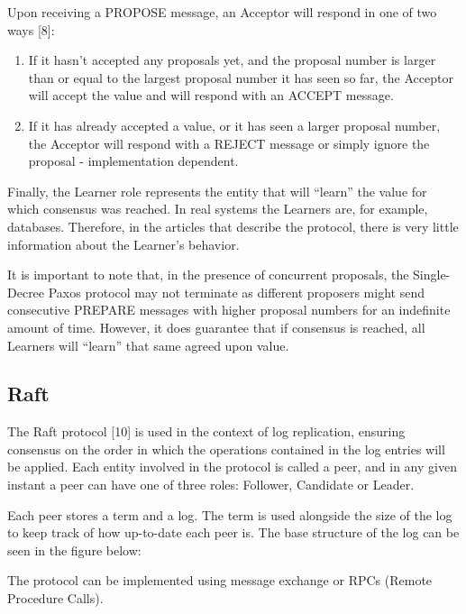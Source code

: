 Upon receiving a PROPOSE message, an Acceptor will respond in one of two ways [8]:

\begin{enumerate}
  \item If it hasn’t accepted any proposals yet, and the proposal number is larger than or equal to the largest proposal number it has seen so far, the Acceptor will accept the value and will respond with an ACCEPT message.
  \item If it has already accepted a value, or it has seen a larger proposal number, the Acceptor will respond with a REJECT message or simply ignore the proposal - implementation dependent.
\end{enumerate}

Finally, the Learner role represents the entity that will “learn” the value for which consensus was reached. In real systems the Learners are, for example, databases. Therefore, in the articles that describe the protocol, there is very little information about the Learner’s behavior.


It is important to note that, in the presence of concurrent proposals, the Single-Decree Paxos protocol may not terminate as different proposers might send consecutive PREPARE messages with higher proposal numbers for an indefinite amount of time. However, it does guarantee that if consensus is reached, all Learners will “learn” that same agreed upon value.




\subsection{Raft}

The Raft protocol [10] is used in the context of log replication, ensuring consensus on the order in which the operations contained in the log entries will be applied. Each entity involved in the protocol is called a peer, and in any given instant a peer can have one of three roles: Follower, Candidate or Leader.

Each peer stores a term and a log. The term is used alongside the size of the log to keep track of how up-to-date each peer is. The base structure of the log can be seen in the figure below:


The protocol can be implemented using message exchange or RPCs (Remote Procedure Calls). 

